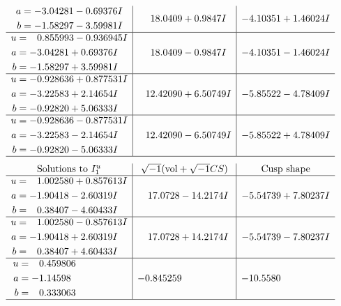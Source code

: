 \documentclass[1p]{elsarticle_modified}
\theoremstyle{definition}
\newcommand{\I}{\sqrt{-1}}
\begin{document}
$$\begin{array}{c|c|c}
\begin{aligned}
a &= -3.04281 - 0.69376 I \\
b &= -1.58297 - 3.59981 I\end{aligned}
 & \phantom{-}18.0409 + 0.9847 I & -4.10351 + 1.46024 I \\ \hline\begin{aligned}
u &= \phantom{-}0.855993 - 0.936945 I \\
a &= -3.04281 + 0.69376 I \\
b &= -1.58297 + 3.59981 I\end{aligned}
 & \phantom{-}18.0409 - 0.9847 I & -4.10351 - 1.46024 I \\ \hline\begin{aligned}
u &= -0.928636 + 0.877531 I \\
a &= -3.22583 + 2.14654 I \\
b &= -0.92820 + 5.06333 I\end{aligned}
 & \phantom{-}12.42090 + 6.50749 I & -5.85522 - 4.78409 I \\ \hline\begin{aligned}
u &= -0.928636 - 0.877531 I \\
a &= -3.22583 - 2.14654 I \\
b &= -0.92820 - 5.06333 I\end{aligned}
 & \phantom{-}12.42090 - 6.50749 I & -5.85522 + 4.78409 I\\
 \hline 
 \end{array}$$\newpage$$\begin{array}{c|c|c}  
\text{Solutions to }I^u_{1}& \I (\text{vol} + \sqrt{-1}CS) & \text{Cusp shape}\\
 \hline 
\begin{aligned}
u &= \phantom{-}1.002580 + 0.857613 I \\
a &= -1.90418 - 2.60319 I \\
b &= \phantom{-}0.38407 - 4.60433 I\end{aligned}
 & \phantom{-}17.0728 - 14.2174 I & -5.54739 + 7.80237 I \\ \hline\begin{aligned}
u &= \phantom{-}1.002580 - 0.857613 I \\
a &= -1.90418 + 2.60319 I \\
b &= \phantom{-}0.38407 + 4.60433 I\end{aligned}
 & \phantom{-}17.0728 + 14.2174 I & -5.54739 - 7.80237 I \\ \hline\begin{aligned}
u &= \phantom{-}0.459806\phantom{ +0.000000I} \\
a &= -1.14598\phantom{ +0.000000I} \\
b &= \phantom{-}0.333063\phantom{ +0.000000I}\end{aligned}
 & -0.845259\phantom{ +0.000000I} & -10.5580\phantom{ +0.000000I}\\
 \hline 
 \end{array}$$\newpage\newpage\renewcommand{\arraystretch}{1}
\end{document}

